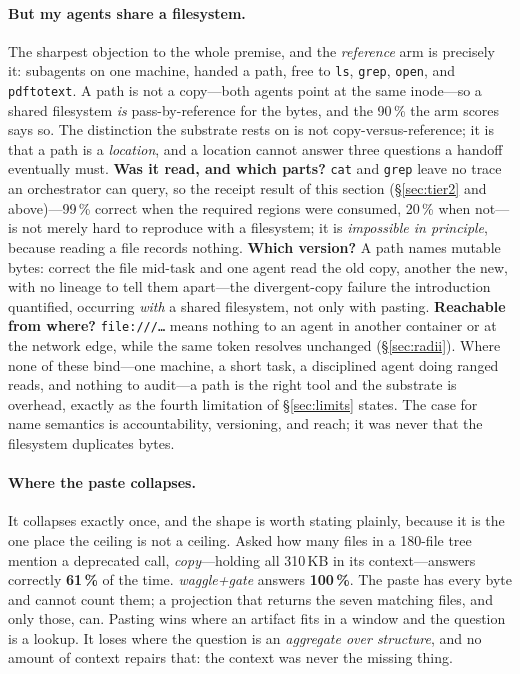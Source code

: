 \documentclass[10pt,twocolumn]{article}
\newcommand{\tok}[1]{\texttt{#1}}
\begin{document}
\paragraph{But my agents share a filesystem.} The sharpest objection to the whole
premise, and the \emph{reference} arm is precisely it: subagents on one machine,
handed a path, free to \tok{ls}, \tok{grep}, \tok{open}, and \tok{pdftotext}. A path
is not a copy---both agents point at the same inode---so a shared filesystem
\emph{is} pass-by-reference for the bytes, and the 90\,\% the arm scores says so.
The distinction the substrate rests on is not copy-versus-reference; it is that a
path is a \emph{location}, and a location cannot answer three questions a handoff
eventually must. \textbf{Was it read, and which parts?} \tok{cat} and \tok{grep}
leave no trace an orchestrator can query, so the receipt result of this section
(\S\ref{sec:tier2} and above)---99\,\% correct when the required regions were
consumed, 20\,\% when not---is not merely hard to reproduce with a filesystem; it is
\emph{impossible in principle}, because reading a file records nothing. \textbf{Which
version?} A path names mutable bytes: correct the file mid-task and one agent read
the old copy, another the new, with no lineage to tell them apart---the divergent-copy
failure the introduction quantified, occurring \emph{with} a shared filesystem, not
only with pasting. \textbf{Reachable from where?} \texttt{file:///…} means nothing to
an agent in another container or at the network edge, while the same token resolves
unchanged (\S\ref{sec:radii}). Where none of these bind---one machine, a short task,
a disciplined agent doing ranged reads, and nothing to audit---a path is the right
tool and the substrate is overhead, exactly as the fourth limitation of
\S\ref{sec:limits} states. The case for name semantics is accountability,
versioning, and reach; it was never that the filesystem duplicates bytes.

\paragraph{Where the paste collapses.} It collapses exactly once, and the shape
is worth stating plainly, because it is the one place the ceiling is not a
ceiling. Asked how many files in a 180-file tree mention a deprecated call,
\emph{copy}---holding all 310\,KB in its context---answers correctly
\textbf{61\,\%} of the time. \emph{waggle+gate} answers \textbf{100\,\%}. The
paste has every byte and cannot count them; a projection that returns the seven
matching files, and only those, can. Pasting wins where an artifact fits in a
window and the question is a lookup. It loses where the question is an
\emph{aggregate over structure}, and no amount of context repairs that: the
context was never the missing thing.
\end{document}
